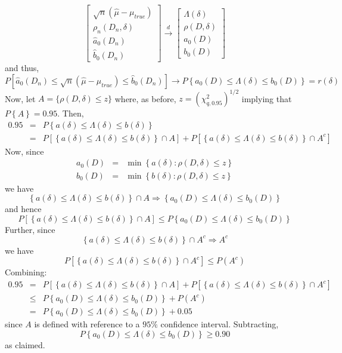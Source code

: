 \documentclass[12pt]{article}
\theoremstyle{definition}
\begin{document}
	$$
	\left[\begin{array}{c}
		\sqrt{n}(\hat{\mu} - \mu_{true})\\
		\rho_n(D_n,\delta)\\
		\widehat{a}_0(D_n)\\
		\widehat{b}_0(D_n)
\end{array}\right] \overset{d}{\rightarrow}
		\left[\begin{array}{c}
		\Lambda(\delta)\\
		\rho(D,\delta)\\
		a_0(D)\\
		b_0(D)
\end{array}\right] 	
$$
and thus, 
	$$P\left[ \widehat{a}_0(D_n) \leq \sqrt{n}\left( \widehat{\mu}-\mu_{true}\right)\leq  \widehat{b}_0(D_n) \right] \rightarrow P\left\{ a_0(D) \leq \Lambda(\delta) \leq b_0(D)\right\} = r(\delta)$$
Now, let $A = \{  \rho(D,\delta)\leq z\}$ where, as before, $z = (\chi^2_{q,0.95})^{1/2}$ implying that $P\left\{A  \right\}=0.95$. Then,
	\begin{eqnarray*}
		0.95 &=& P\left\{a(\delta) \leq \Lambda(\delta) \leq b(\delta)  \right\}\\
			&=& P\left[\left\{a(\delta) \leq \Lambda(\delta) \leq b(\delta)  \right\}\cap A \right] + P\left[\left\{a(\delta) \leq \Lambda(\delta) \leq b(\delta)  \right\}\cap A^c \right] 
\end{eqnarray*}
Now, since
		\begin{eqnarray*}
		a_0(D)&=&\min \left\{a(\delta)\colon \rho(D, \delta) \leq z\right\}\\
		b_0(D)&=&\min \left\{b(\delta)\colon \rho(D, \delta) \leq z\right\}
\end{eqnarray*}
we have
$$\left\{a(\delta) \leq \Lambda(\delta) \leq b(\delta)  \right\}\cap A \Rightarrow \left\{a_0(D)  \leq \Lambda(\delta) \leq b_0(D)\right\}$$
and hence
	$$P\left[\left\{a(\delta) \leq \Lambda(\delta) \leq b(\delta)  \right\}\cap A \right]  \leq P\left\{a_0(D)  \leq \Lambda(\delta) \leq b_0(D)\right\}$$
Further, since
	$$\left\{a(\delta) \leq \Lambda(\delta) \leq b(\delta)  \right\}\cap A^c \Rightarrow A^c$$
we have
	$$P\left[\left\{a(\delta) \leq \Lambda(\delta) \leq b(\delta)  \right\}\cap A^c \right]  \leq P(A^c)$$
Combining:
		\begin{eqnarray*}
		0.95 &=& P\left[\left\{a(\delta) \leq \Lambda(\delta) \leq b(\delta)  \right\}\cap A \right] + P\left[\left\{a(\delta) \leq \Lambda(\delta) \leq b(\delta)  \right\}\cap A^c \right] \\
			&\leq&  P\left\{a_0(D)  \leq \Lambda(\delta) \leq b_0(D)\right\} + P(A^c)\\
			&=& P\left\{a_0(D)  \leq \Lambda(\delta) \leq b_0(D)\right\} + 0.05
\end{eqnarray*}
since $A$ is defined with reference to a $95\%$ confidence interval. Subtracting, 
	$$P\left\{a_0(D)  \leq \Lambda(\delta) \leq b_0(D)\right\} \geq 0.90$$
as claimed.
\end{document}
